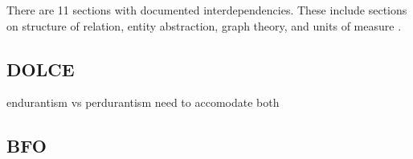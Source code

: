 \documentclass[12pt,a4paper]{article}
\begin{document}
There are 11 sections with documented interdependencies. These include sections on structure of relation, entity abstraction, graph theory, and units of measure \citep{sumo}.



\subsection{DOLCE}
\citep{dolce}




endurantism vs perdurantism need to accomodate both

\subsection{BFO}


\end{document}
